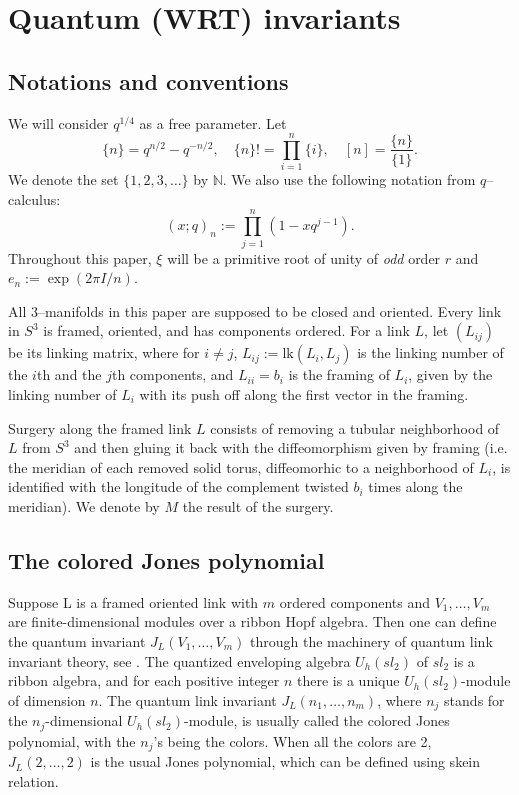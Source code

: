 \documentclass[12pt]{amsart}
\theoremstyle{plain}
\theoremstyle{definition}
\newcommand{\qbinom}[2]{\text{$\left[\begin{array}{c}#1\\ #2\end{array}
\right]$}}
\def\lk{\operatorname{lk}}
\def\N{{\mathbb N}}
\def\lk{{\text{lk}}}
\begin{document}
\section{Quantum (WRT) invariants}
 \label{defs}

\subsection{Notations and conventions}
We will consider $q^{1/4}$ as a free parameter. Let
\[
\{n\} = q^{n/2}-q^{-n/2},
 \quad  \{n\}!=
\prod_{i=1}^n \{i\} ,\quad  [n] =\frac{\{n\}}{\{1\}}.
\]
We denote the set $\{1,2,3,\ldots\}$ by
$\N$.
We also use the following notation from $q$--calculus:
$$ (x;q)_n := \prod_{j=1}^n (1-x q^{j-1}).$$
Throughout this paper,
  $\xi$ will be  a primitive root
of unity of {\em odd} order $r$ and $e_n:=\exp(2\pi I/n)$.


All 3--manifolds in this paper are supposed to be  closed and
oriented. Every link in $S^3$ is framed, oriented, and has
components ordered.
For a  link $L$,
let $(L_{ij})$ be its linking matrix, where for $i\neq j$,
$L_{ij}:=\lk(L_i,L_j)$ is the linking number of the $i$th and the $j$th
components,
and $L_{ii}=b_i$ is the
 framing of  $L_i$,
given by the linking number  of $L_i$ with its push off
along the first vector in the framing.

Surgery along the framed link $L$ consists of removing a tubular neighborhood of $L$
from $S^3$ and then gluing it back with the diffeomorphism given by framing
(i.e. the meridian of each removed solid torus, diffeomorhic to a neighborhood of $L_i$,
is identified with the
longitude of the complement twisted $b_i$ times along the meridian).
We denote by   $M$ the result of the surgery.





\subsection{The colored Jones polynomial}
\newcommand{\RR} {\mathbf R}

Suppose L is a framed oriented link with $m$ ordered components and $V_1,\dots,V_m$ are finite-dimensional modules
over a ribbon Hopf algebra. Then one can define the quantum invariant $J_L(V_1,\dots,V_m)$ through the machinery of quantum link invariant theory, see  \cite{Tu}.
The quantized enveloping algebra $U_h(sl_2)$ of $sl_2$ is a ribbon algebra, and
 for each positive integer $n$ there is
a unique $U_h(sl_2)$-module of dimension $n$. The quantum link invariant $J_L(n_1,\dots,n_m)$, where $n_j$ stands for the $n_j$-dimensional $U_h(sl_2)$-module, is usually called
the colored Jones polynomial, with the $n_j$'s being the colors. When all the colors are 2, $J_L(2,\dots,2)$ is the usual Jones polynomial, which can be defined using
skein relation.
\end{document}
